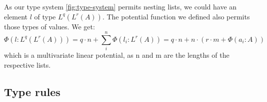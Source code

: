 As our type system \ref{fig:type-system} permits nesting lists, we could have an element $l$ of type $L^q(L^r(A))$. The potential function we defined also permits those types of values. We get: 
$$\Phi(l : L^q(L^r(A))) = q \cdot n + \displaystyle\sum_{i}^{n} \Phi(l_i : L^r(A)) = q \cdot n + n \cdot (r \cdot m + \Phi(a_i : A)) $$ 
which is a multivariate linear potential, as n and m are the lengths of the respective lists.




\subsection{Type rules}
\label{sec:type-rules}
